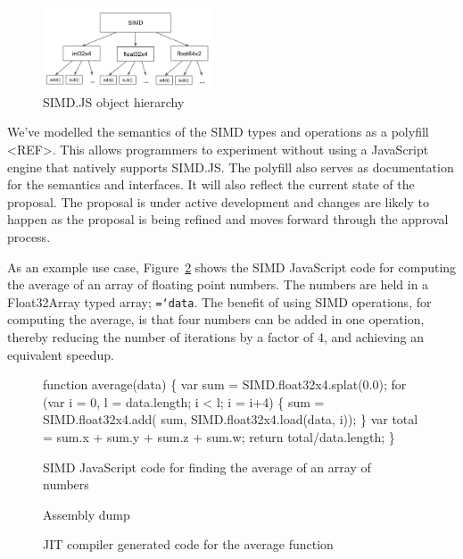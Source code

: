 \documentclass[preprint]{sigplanconf}
\newcommand{\ttt}[1]{{\texttt{\hyphenchar\font=`\-\relax #1}}}%
\begin{document}
\begin{figure}
\begin{center}
\includegraphics[width=0.45\textwidth]{figures/hierarchy.png}
\end{center}
\caption{SIMD.JS object hierarchy}
\label{fig:hierarchy}
\end{figure}

We've modelled the semantics of the SIMD types and operations as a polyfill 
<REF>.  This allows programmers to experiment without using a JavaScript
engine that natively supports SIMD.JS.  The polyfill also serves as documentation
for the semantics and interfaces.  It will also reflect the current state of
the proposal.  The proposal is under active development and changes are likely to 
happen as the proposal is being refined and moves forward through the approval
process.

As an example use case, Figure~\ref{fig:average-simd} shows the SIMD JavaScript
code for computing the average of an array of floating point numbers.  The numbers
are held in a Float32Array typed array; \ttt{data}.  The benefit of using SIMD 
operations, for computing the average, is that four numbers can be added in one
operation, thereby reducing the number of iterations by a factor of 4, and 
achieving an equivalent speedup.

\begin{figure}
\begin{small}
\begin{program}[style=tt, number=true]
fu\tab{}nction average(data) \{
  var sum = SIMD.float32x4.splat(0.0);
  fo\tab{}r (var i = 0, l = data.length; i < l; i = i+4) \{
    su\tab{}m = SIMD.float32x4.add(
      sum, SIMD.float32x4.load(data, i));\untab{}\untab{}
  \}
  var total = sum.x + sum.y + sum.z + sum.w;
  return total/data.length;\untab{}
\}
\end{program}
\end{small}
\caption{SIMD JavaScript code for finding the average of an array of numbers}
\label{fig:average-simd}
\end{figure}

\begin{figure}
\begin{small}
\begin{program}[style=tt, number=true]
Assembly dump
\end{program}
\end{small}
\caption{JIT compiler generated code for the average function}
\label{fig:average-simd-code}
\end{figure}
\end{document}
